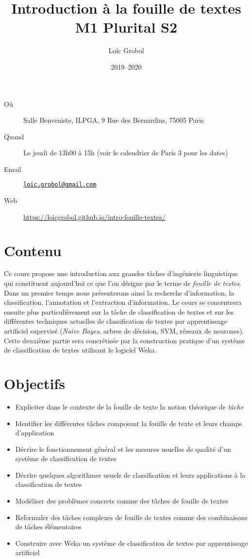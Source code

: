 \documentclass[a4paper, 11pt]{article}
\title{Introduction à la fouille de textes\\M1 Plurital S2}
\author{Loïc Grobol}
\date{2019–2020}
\begin{document}
\vspace*{-7em}
{\let\newpage\relax\maketitle}
\thispagestyle{main}

\begin{description}
    \item[Où] Salle Benveniste, ILPGA, 9 Rue des Bernardins, 75005 Paris
    \item[Quand] Le jeudi de 13h00 à 15h (voir le calendrier de Paris 3 pour les dates)
    \item[Email] \href{mailto:loic.grobol@gmail.com}{\texttt{loic.grobol@gmail.com}}
    \item[Web] \url{https://loicgrobol.github.io/intro-fouille-textes/}
\end{description}

\section*{Contenu}
Ce cours propose une introduction aux grandes tâches d'ingénierie linguistique qui constituent aujourd'hui ce que l'on désigne par le terme de \emph{fouille de textes}.
Dans un premier temps nous présenterons ainsi la recherche d'information, la classification, l'annotation et l'extraction d'information.
Le  cours se  concentrera ensuite plus particulièrement sur la tâche de classification de textes et sur les différentes techniques actuelles de classification de textes par apprentissage artificiel supervisé (\emph{Naive Bayes}, arbres de décision, SVM, réseaux de neurones).
Cette deuxième partie sera concrétisée par la construction pratique d'un système de classification de textes utilisant le logiciel Weka.

\section*{Objectifs}

\begin{itemize}
    \item Expliciter dans le contexte de la fouille de texte la notion théorique de \emph{tâche}
    \item Identifier les différentes tâches composant la fouille de texte et leurs champs d'application
    \item Décrire le fonctionnement général et les mesures usuelles de qualité d'un système de classification de textes
    \item Décrire quelques algorithmes usuels de classification et leurs applications à la classification de textes
    \item Modéliser des problèmes concrets comme des tâches de fouille de textes
    \item Reformuler des tâches complexes de fouille de textes comme des combinaisons de tâches élémentaires
    \item Construire avec Weka un système de classification de textes par apprentissage artificiel
\end{itemize}
\end{document}
